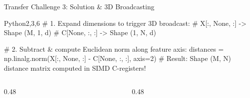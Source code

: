 \begin{frame}[fragile]{Transfer Challenge 3: Solution \& 3D Broadcasting}
  \begin{HighlightedCodeBlock}{Python}{2,3,6}
# 1. Expand dimensions to trigger 3D broadcast:
# X[:, None, :] -> Shape (M, 1, d)
# C[None, :, :] -> Shape (1, N, d)

# 2. Subtract & compute Euclidean norm along feature axis:
distances = np.linalg.norm(X[:, None, :] - C[None, :, :], axis=2)
# Result: Shape (M, N) distance matrix computed in SIMD C-registers!
  \end{HighlightedCodeBlock}
  \vfill
  \begin{columns}[c,onlytextwidth]
    \begin{column}{0.48\textwidth}
    \end{column}
    \begin{column}{0.48\textwidth}
    \end{column}
  \end{columns}
\end{frame}

